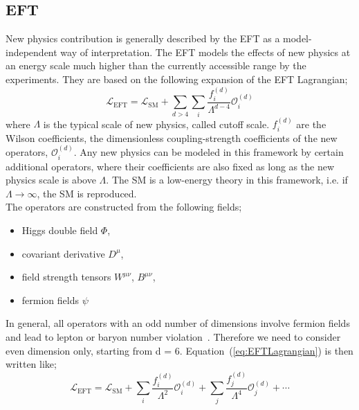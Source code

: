 \subsection{EFT}
\label{subsec:EFT}
New physics contribution is generally described by the EFT as a model-independent way of interpretation.
The EFT models the effects of new physics at an energy scale much higher than the currently accessible range by the experiments. 
They are based on the following expansion of the EFT Lagrangian;
\begin{equation}
\label{eq:EFTLagrangian}
\mathcal{L}_{\mathrm{EFT}}=\mathcal{L}_{\mathrm{SM}}+\sum_{d>4} \sum_{i} \frac{f_{i}^{(d)}}{\Lambda^{d-4}} \mathcal{O}_{i}^{(d)}
\end{equation}
where $\Lambda$ is the typical scale of new physics, called cutoff scale. 
$f_{i}^{(d)}$ are the Wilson coefficients, the dimensionless coupling-strength coefficients of the new operators, $\mathcal{O}_{i}^{(d)}$.
Any new physics can be modeled in this framework by certain additional operators, where their coefficients are also fixed as long as the new physics scale is above $\Lambda$. 
The SM is a low-energy theory in this framework, i.e. if $\Lambda \rightarrow \infty$, the SM is reproduced.
\\
The operators are constructed from the following fields;
\begin{itemize}
    \item Higgs double field $\Phi$,
    \item covariant derivative $D^{\mu}$,
    \item field strength tensors $W^{\mu\nu}$, $B^{\mu\nu}$,
    \item fermion fields $\psi$
\end{itemize}
In general, all operators with an odd number of dimensions involve fermion fields and lead to lepton or baryon number violation~\cite{PhysRevLett.43.1566}. Therefore we need to consider even dimension only, starting from d = 6.
Equation~(\ref{eq:EFTLagrangian}) is then written like;
\begin{equation}
\label{eq:EFTLagrangian2}
\mathcal{L}_{\mathrm{EFT}}=\mathcal{L}_{\mathrm{SM}} + \sum_{i} \frac{f_{i}^{(d)}}{\Lambda^{2}} \mathcal{O}_{i}^{(d)} +  \sum_{j} \frac{f_{j}^{(d)}}{\Lambda^{4}} \mathcal{O}_{j}^{(d)} + \cdots
\end{equation}

